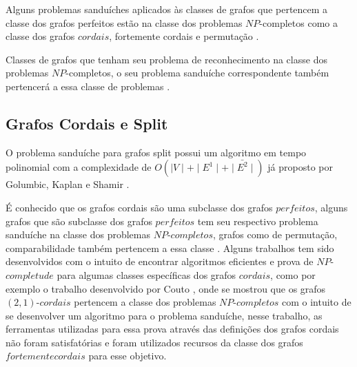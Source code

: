 Alguns problemas sanduíches aplicados às classes de grafos que pertencem a classe dos grafos perfeitos estão na classe dos problemas $NP$-completos como a classe dos grafos $cordais$, fortemente cordais e permutação \cite{golumbic:95}. 

Classes de grafos que tenham seu problema de reconhecimento na classe dos problemas $NP$-completos, o seu problema sanduíche correspondente também pertencerá a essa classe de problemas \cite{fernanda:2016}.

\subsection{Grafos Cordais e Split}

O problema sanduíche para grafos split possui um algoritmo em tempo polinomial com a complexidade de $O(\mid V \mid + \mid E^1 \mid + \mid \bar{E^2} \mid)$ já proposto por Golumbic, Kaplan e Shamir \cite{golumbic:95}.   

É conhecido que os grafos cordais são uma subclasse dos grafos $perfeitos$, alguns grafos que são subclasse dos grafos $perfeitos$ tem seu respectivo problema sanduíche na classe dos problemas $NP$-$completos$, grafos como de permutação, comparabilidade também pertencem a essa classe \cite{golumbic:95}. Alguns trabalhos tem sido desenvolvidos com o intuito de encontrar algoritmos eficientes e prova de $NP$-$completude$ para algumas classes específicas dos grafos $cordais$, como por exemplo o trabalho desenvolvido por Couto \cite{fernandasbpo:2012}, onde se mostrou que os grafos $(2,1)$-$cordais$ pertencem a classe dos problemas $NP$-$completos$ com o intuito de se desenvolver um algoritmo para o problema sanduíche, nesse trabalho, as ferramentas utilizadas para essa prova através das definições dos grafos cordais não foram satisfatórias e foram utilizados recursos da classe dos grafos $fortemente cordais$ para esse objetivo. 